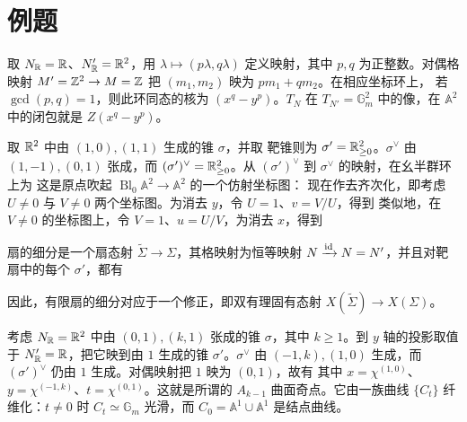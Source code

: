 \section{例题}
\begin{example}\label{ex:4.15}
取 $N_{\mathbb R}=\mathbb R$、$N'_{\mathbb R}=\mathbb R^2$，用 $\lambda\mapsto(p\lambda,q\lambda)$ 定义映射，其中 $p,q$ 为正整数。对偶格映射 $M'=\mathbb Z^2\to M=\mathbb Z$ 把 $(m_1,m_2)$ 映为 $pm_1+qm_2$。在相应坐标环上，
若 $\gcd(p,q)=1$，则此环同态的核为 $(x^q-y^p)$。$T_N$ 在 $T_{N'}=\mathbb G_m^2$ 中的像，在 $\mathbb A^2$ 中的闭包就是 $Z(x^q-y^p)$。
\end{example}
\begin{example}\label{ex:4.16}
取 $\mathbb R^2$ 中由 $(1,0),(1,1)$ 生成的锥 $\sigma$，并取
靶锥则为 $\sigma'=\mathbb R_{\ge0}^2$。$\sigma^\vee$ 由 $(1,-1),(0,1)$ 张成，而 $(\sigma')^\vee=\mathbb R_{\ge0}^2$。从 $(\sigma')^\vee$ 到 $\sigma^\vee$ 的映射，在幺半群环上为
这是原点吹起 $\operatorname{Bl}_0\mathbb A^2\to\mathbb A^2$ 的一个仿射坐标图：
现在作去齐次化，即考虑 $U\ne0$ 与 $V\ne0$ 两个坐标图。为消去 $y$，令 $U=1$、$v=V/U$，得到
类似地，在 $V\ne0$ 的坐标图上，令 $V=1$、$u=U/V$，为消去 $x$，得到
\end{example}
\begin{definition}\label{def:4.10}
扇的细分是一个扇态射 $\widetilde\Sigma\to\Sigma$，其格映射为恒等映射 $N\xrightarrow{\operatorname{id}}N=N'$，并且对靶扇中的每个 $\sigma'$，都有
\end{definition}
因此，有限扇的细分对应于一个修正，即双有理固有态射 $X(\widetilde\Sigma)\to X(\Sigma)$。
\begin{example}\label{ex:4.17}
考虑 $N_{\mathbb R}=\mathbb R^2$ 中由 $(0,1),(k,1)$ 张成的锥 $\sigma$，其中 $k\ge1$。到 $y$ 轴的投影取值于 $N'_{\mathbb R}=\mathbb R$，把它映到由 $1$ 生成的锥 $\sigma'$。$\sigma^\vee$ 由 $(-1,k),(1,0)$ 生成，而 $(\sigma')^\vee$ 仍由 $1$ 生成。对偶映射把 $1$ 映为 $(0,1)$，故有
其中 $x=\chi^{(1,0)}$、$y=\chi^{(-1,k)}$、$t=\chi^{(0,1)}$。这就是所谓的 $A_{k-1}$ 曲面奇点。它由一族曲线 $\{C_t\}$ 纤维化：$t\ne0$ 时 $C_t\simeq\mathbb G_m$ 光滑，而 $C_0=\mathbb A^1\cup\mathbb A^1$ 是结点曲线。
\end{example}
